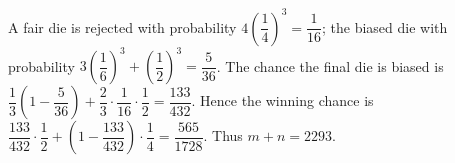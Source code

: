A fair die is rejected with probability $4(\dfrac{1}{4})^3=\dfrac{1}{16}$; the biased die with probability $3(\dfrac{1}{6})^3+(\dfrac{1}{2})^3=\dfrac{5}{36}$. The chance the final die is biased is $\dfrac{1}{3}(1-\dfrac{5}{36})+\dfrac{2}{3}\cdot\dfrac{1}{16}\cdot\dfrac{1}{2}=\dfrac{133}{432}$. Hence the winning chance is $\dfrac{133}{432}\cdot\dfrac{1}{2}+(1-\dfrac{133}{432})\cdot\dfrac{1}{4}=\dfrac{565}{1728}$. Thus $\boxed{m+n=2293}$.
